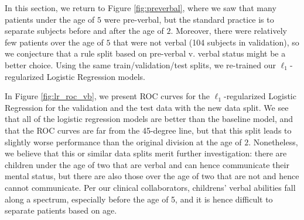 \documentclass[11pt, letterpaper]{amsart}
\begin{document}
In this section, we return to Figure \ref{fig:preverbal}, where we saw that many patients under the age of $5$ were pre-verbal, but the standard practice is to separate subjects before and after the age of $2$. Moreover, there were relatively few patients over the age of $5$ that were not verbal (104 subjects in validation), so we conjecture that a rule split based on pre-verbal v. verbal status might be a better choice. Using the same train/validation/test splits, we re-trained our $\ell_1$-regularized Logistic Regression models. 

In Figure \ref{fig:lr_roc_vb}, we present ROC curves for the $\ell_1$-regularized Logistic Regression for the validation and the test data with the new data split. We see that all of the logistic regression models are better than the baseline model, and that the ROC curves are far from the 45-degree line, but that this split leads to slightly worse performance than the original division at the age of $2$. Nonetheless, we believe that this or similar data splits merit further investigation: there are children under the age of two that are verbal and can hence communicate their mental status, but there are also those over the age of two that are not and hence cannot communicate. Per our clinical collaborators, childrens' verbal abilities fall along a spectrum, especially before the age of 5, and it is hence difficult to separate patients based on age. 
\end{document}
